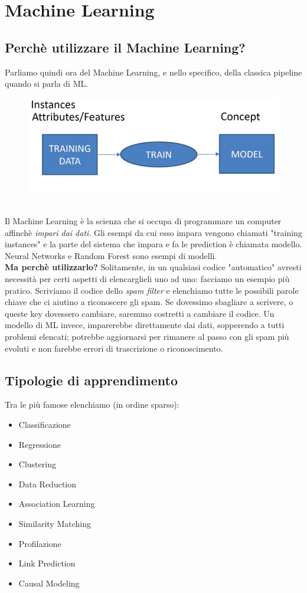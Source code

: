 \section{Machine Learning}
\subsection{Perchè utilizzare il Machine Learning?}
Parliamo quindi ora del Machine Learning, e nello specifico, della classica pipeline quando si parla di ML. 
\\
\begin{figure}[th]
    \centering
    \includegraphics[scale=0.5]{ML/img/MLPipeline.png}
    \label{fig:MLpip}
\end{figure}
\\
Il Machine Learning è la scienza che si occupa di programmare un computer affinchè \textit{impari dai dati}. Gli esempi da cui esso impara vengono chiamati "training instances" e la parte del sistema che impara e fa le prediction è chiamata modello. Neural Networks e Random Forest sono esempi di modelli. 
\\
\textbf{Ma perchè utilizzarlo?} Solitamente, in un qualsiasi codice "automatico" avresti necessità per certi aspetti di elencarglieli uno ad uno: facciamo un esempio più pratico. Scriviamo il codice dello \textit{spam filter} e elenchiamo tutte le possibili parole chiave che ci aiutino a riconoscere gli spam. Se dovessimo sbagliare a scrivere, o queste key dovessero cambiare, saremmo costretti a cambiare il codice. Un modello di ML invece, imparerebbe direttamente dai dati, sopperendo a tutti problemi elencati; potrebbe aggiornarsi per rimanere al passo con gli spam più evoluti e non farebbe errori di trascrizione o riconoscimento. 

\subsection{Tipologie di apprendimento}
Tra le più famose elenchiamo (in ordine sparso):
\begin{itemize}
    \item Classificazione
    \item Regressione
    \item Clustering 
    \item Data Reduction
    \item Association Learning 
    \item Similarity Matching
    \item Profilazione
    \item Link Prediction
    \item Causal Modeling
\end{itemize}


